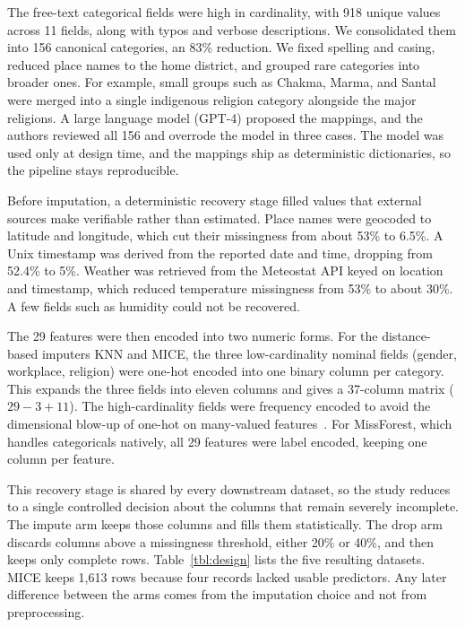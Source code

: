 \documentclass[conference]{IEEEtran}
\begin{document}
The free-text categorical fields were high in cardinality, with 918 unique values across 11 fields, along with typos and verbose descriptions. We consolidated them into 156 canonical categories, an 83\% reduction. We fixed spelling and casing, reduced place names to the home district, and grouped rare categories into broader ones. For example, small groups such as Chakma, Marma, and Santal were merged into a single indigenous religion category alongside the major religions. A large language model (GPT-4) proposed the mappings, and the authors reviewed all 156 and overrode the model in three cases. The model was used only at design time, and the mappings ship as deterministic dictionaries, so the pipeline stays reproducible.

Before imputation, a deterministic recovery stage filled values that external sources make verifiable rather than estimated. Place names were geocoded to latitude and longitude, which cut their missingness from about 53\% to 6.5\%. A Unix timestamp was derived from the reported date and time, dropping from 52.4\% to 5\%. Weather was retrieved from the Meteostat API keyed on location and timestamp, which reduced temperature missingness from 53\% to about 30\%. A few fields such as humidity could not be recovered.

The 29 features were then encoded into two numeric forms. For the distance-based imputers KNN and MICE, the three low-cardinality nominal fields (gender, workplace, religion) were one-hot encoded into one binary column per category. This expands the three fields into eleven columns and gives a 37-column matrix ($29-3+11$). The high-cardinality fields were frequency encoded to avoid the dimensional blow-up of one-hot on many-valued features~\cite{pargent2022highcardinality}. For MissForest, which handles categoricals natively, all 29 features were label encoded, keeping one column per feature.

This recovery stage is shared by every downstream dataset, so the study reduces to a single controlled decision about the columns that remain severely incomplete. The impute arm keeps those columns and fills them statistically. The drop arm discards columns above a missingness threshold, either 20\% or 40\%, and then keeps only complete rows. Table~\ref{tbl:design} lists the five resulting datasets. MICE keeps 1{,}613 rows because four records lacked usable predictors. Any later difference between the arms comes from the imputation choice and not from preprocessing.
\end{document}
